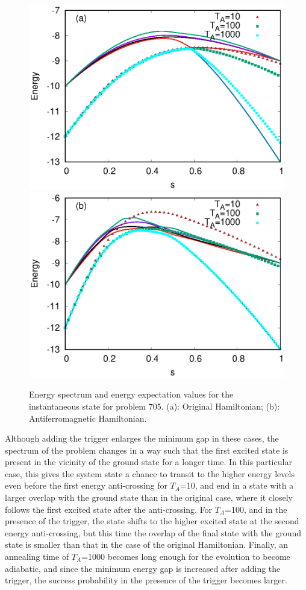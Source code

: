 \documentclass[../main.tex]{subfiles}
\begin{document}
\begin{figure}[H]
\centering 
\includegraphics[scale=0.8]{705_O_T.eps}
\includegraphics[scale=0.8]{705_A_T_g1.eps}
\caption{Energy spectrum and energy expectation values for the instantaneous state for problem 705. (a): Original Hamiltonian; (b): Antiferromagnetic Hamiltonian. }
\label{fig:a24}
\end{figure}

Although adding the trigger enlarges the minimum gap in these cases, the spectrum of the problem changes in a way such that the first excited state is present in the vicinity of the ground state for a longer time. In this particular case, this gives the system state a chance to transit to the higher energy levels even before the first energy anti-crossing for $T_A$=10, and end in a state with a larger overlap with the ground state than in the original case, where it closely follows the first excited state after the anti-crossing. For $T_A$=100, and in the presence of the trigger, the state shifts to the higher excited state at the second energy anti-crossing, but this time the overlap of the final state with the ground state is smaller than that in the case of the original Hamiltonian. Finally, an annealing time of $T_A$=1000 becomes long enough for the evolution to become adiabatic, and since the minimum energy gap is increased after adding the trigger, the success probability in the presence of the trigger becomes larger.\\
\end{document}
